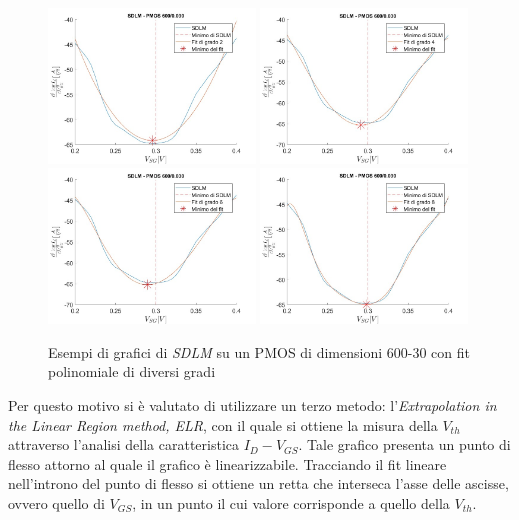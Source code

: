 \documentclass[12pt, letterpaper]{book}
\begin{document}
\begin{figure}[H]
  \centering
  \includegraphics[width=0.49\textwidth]{SDLM-P1-600-30-grado2}
  \includegraphics[width=0.49\textwidth]{SDLM-P1-600-30-grado4}
  \includegraphics[width=0.49\textwidth]{SDLM-P1-600-30-grado6}
  \includegraphics[width=0.49\textwidth]{SDLM-P1-600-30-grado8}
  \caption{Esempi di grafici di \emph{SDLM} su un PMOS di dimensioni 600-30 con fit polinomiale di diversi gradi}
\end{figure}



Per questo motivo si è valutato di utilizzare un terzo metodo: l'\emph{Extrapolation in the Linear Region method, ELR}, con il quale si ottiene la misura della $V_{th}$ attraverso l'analisi della caratteristica $I_D-V_{GS}$.  Tale grafico presenta un punto di flesso attorno al quale il grafico è linearizzabile. Tracciando il fit lineare nell'introno del punto di flesso si ottiene un retta che interseca l'asse delle ascisse, ovvero quello di $V_{GS}$, in un punto il cui valore corrisponde a quello della $V_{th}$.\\
\end{document}
